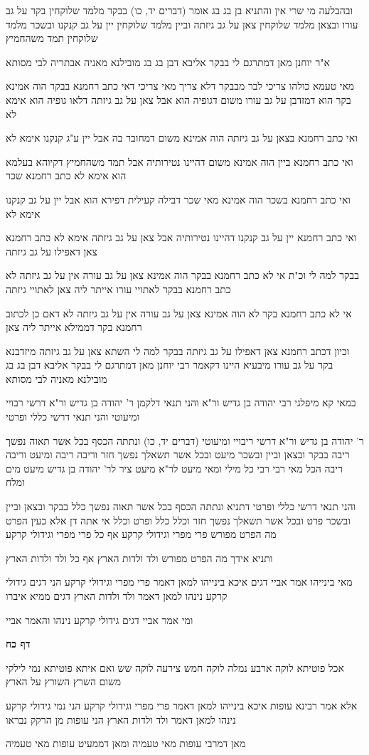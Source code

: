 \documentclass[12pt, openany]{book}
\newcommand{\sethebfont}{
\fontsize{10.5pt}{21.0pt} \selectfont
}
\newcommand{\textblock}[1]{
{\sethebfont #1\\}	
}
\newcommand{\sectname}{}
\newcommand{\newsection}[1]{
	\addcontentsline{toc}{section}{#1}
	\renewcommand{\sectname}{#1}	
	\vspace{-\baselineskip}
	\begin{center}
		\textbf{%
\fontsize{16pt}{16pt}\selectfont
			#1}
	\end{center}
	\vspace{-\baselineskip}
	\nopagebreak
}
\begin{document}
\textblock{ובהבלעה מי שרי אין והתניא בן בג בג אומר (דברים יד, כו) בבקר מלמד שלוקחין בקר על גב עורו ובצאן מלמד שלוקחין צאן על גב גיזתה וביין מלמד שלוקחין יין על גב קנקנו ובשכר מלמד שלוקחין תמד משהחמיץ}
\textblock{א"ר יוחנן מאן דמתרגם לי בבקר אליבא דבן בג בג מובילנא מאניה אבתריה לבי מסותא}
\textblock{מאי טעמא כולהו צריכי לבר מבבקר דלא צריך מאי צריכי דאי כתב רחמנא בבקר הוה אמינא בקר הוא דמזדבן על גב עורו משום דגופיה הוא אבל צאן על גב גיזתה דלאו גופיה הוא אימא לא}
\textblock{ואי כתב רחמנא בצאן על גב גיזתה הוה אמינא משום דמחובר בה אבל יין ע"ג קנקנו אימא לא}
\textblock{ואי כתב רחמנא ביין הוה אמינא משום דהיינו נטירותיה אבל תמד משהחמיץ דקיוהא בעלמא הוא אימא לא כתב רחמנא שכר}
\textblock{ואי כתב רחמנא בשכר הוה אמינא מאי שכר דבילה קעילית דפירא הוא אבל יין על גב קנקנו אימא לא}
\textblock{ואי כתב רחמנא יין על גב קנקנו דהיינו נטירותיה אבל צאן על גב גיזתה אימא לא כתב רחמנא צאן דאפילו על גב גיזתה}
\textblock{בבקר למה לי וכ"ת אי לא כתב רחמנא בבקר הוה אמינא צאן על גב עורה אין על גב גיזתה לא כתב רחמנא בבקר לאתויי עורו אייתר ליה צאן לאתויי גיזתה}
\textblock{אי לא כתב רחמנא בקר לא הוה אמינא צאן על גב עורה אין על גב גיזתה לא דאם כן לכתוב רחמנא בקר דממילא אייתר ליה צאן}
\textblock{וכיון דכתב רחמנא צאן דאפילו על גב גיזתה בבקר למה לי השתא צאן על גב גיזתה מיזדבנא בקר על גב עורו מיבעיא היינו דקאמר רבי יוחנן מאן דמתרגם לי בבקר אליבא דבן בג בג מובילנא מאניה לבי מסותא}
\textblock{במאי קא מיפלגי רבי יהודה בן גדיש ור"א והני תנאי דלקמן ר' יהודה בן גדיש ור"א דרשי רבויי ומיעוטי והני תנאי דרשי כללי ופרטי}
\textblock{ר' יהודה בן גדיש ור"א דרשי ריבויי ומיעוטי (דברים יד, כו) ונתתה הכסף בכל אשר תאוה נפשך ריבה בבקר ובצאן וביין ובשכר מיעט ובכל אשר תשאלך נפשך חזר וריבה ריבה ומיעט וריבה ריבה הכל מאי רבי רבי כל מילי ומאי מיעט לר"א מיעט ציר לר' יהודה בן גדיש מיעט מים ומלח}
\textblock{והני תנאי דרשי כללי ופרטי דתניא ונתתה הכסף בכל אשר תאוה נפשך כלל בבקר ובצאן וביין ובשכר פרט ובכל אשר תשאלך נפשך חזר וכלל כלל ופרט וכלל אי אתה דן אלא כעין הפרט מה הפרט מפורש פרי מפרי וגידולי קרקע אף כל פרי מפרי וגידולי קרקע}
\textblock{ותניא אידך מה הפרט מפורש ולד ולדות הארץ אף כל ולד ולדות הארץ}
\textblock{מאי בינייהו אמר אביי דגים איכא בינייהו למאן דאמר פרי מפרי וגידולי קרקע הני דגים גידולי קרקע נינהו למאן דאמר ולד ולדות הארץ דגים ממיא איברו}
\textblock{ומי אמר אביי דגים גידולי קרקע נינהו והאמר אביי}
\newsection{דף כח}
\textblock{אכל פוטיתא לוקה ארבע נמלה לוקה חמש צירעה לוקה שש ואם איתא פוטיתא נמי לילקי משום השרץ השורץ על הארץ}
\textblock{אלא אמר רבינא עופות איכא בינייהו למאן דאמר פרי מפרי וגידולי קרקע הני נמי גידולי קרקע נינהו למאן דאמר ולד ולדות הארץ הני עופות מן הרקק נבראו}
\textblock{מאן דמרבי עופות מאי טעמיה ומאן דממעיט עופות מאי טעמיה}
\end{document}
